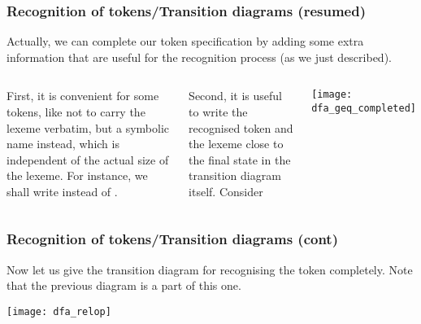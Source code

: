 % 
\begin{frame}
\frametitle{Recognition of tokens/Transition diagrams (resumed)}

\label{dfa_geq_completed}

Actually, we can complete our token specification by adding some extra
information that are useful for the recognition process (as we just
described).

\bigskip

\begin{columns}

   First, it is convenient for some tokens, like
   not to carry the lexeme verbatim, but a symbolic
  name instead, which is independent of the actual size of the
  lexeme. For instance, we shall write  instead of
  .

   Second, it is useful to write the recognised
  token and the lexeme close to the final state in the transition
  diagram itself. Consider
  \begin{center}
    \texttt{[image: dfa\_geq\_completed]}
  \end{center}

\end{columns}

\end{frame}

% 
\begin{frame}
\frametitle{Recognition of tokens/Transition diagrams (cont)}

\label{dfa_relop}

Now let us give the transition diagram for recognising the
token  completely. Note that the previous diagram
is a part of this one.
\begin{center}
\texttt{[image: dfa\_relop]}
\end{center}

\end{frame}

